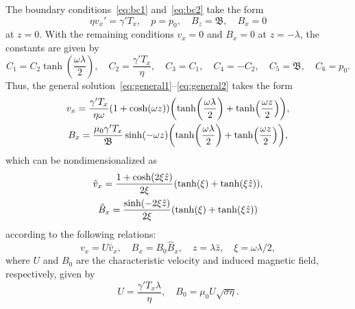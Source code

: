 \documentclass{article}
\begin{document}
The boundary conditions~\eqref{eq:bc1} and~\eqref{eq:bc2} take the form
\begin{equation}\label{eq:bc}
    \eta v_x' = \gamma'T_x, \quad p = p_0, \quad
        B_z = \mathfrak{B}, \quad B_x = 0
\end{equation}
at $z=0$.
With the remaining conditions $v_x=0$ and $B_x=0$ at $z=-\lambda$,
the constants are given by
\begin{equation}\label{eq:constants}
    C_1 = C_2\tanh(\frac{\omega\lambda}2), \quad
    C_2 = \frac{\gamma'T_x}{\eta}, \quad
    C_3 = C_1, \quad C_4 = -C_2, \quad
    C_5 = \mathfrak{B}, \quad C_6 = p_0.
\end{equation}
Thus, the general solution~\eqref{eq:general1}--\eqref{eq:general2} takes the form
\begin{gather}
    v_x = \frac{\gamma'T_x}{\eta\omega}(1+\cosh(\omega z))
        \qty(\tanh(\frac{\omega\lambda}2) + \tanh(\frac{\omega z}2)), \label{eq:v_x}\\
    B_x = \frac{\mu_0\gamma'T_x}{\mathfrak{B}}\sinh(-\omega z)
        \qty(\tanh(\frac{\omega\lambda}2) + \tanh(\frac{\omega z}2)), \label{eq:B_x}
\end{gather}
which can be nondimensionalized as
\begin{gather}
    \hat{v}_x = \frac{1+\cosh(2\xi\hat{z})}{2\xi}
        \qty( \tanh(\xi) + \tanh(\xi\hat{z}) ), \label{eq:hatv_x}\\
    \hat{B}_x = \frac{\sinh(-2\xi\hat{z})}{2\xi}
        \qty( \tanh(\xi) + \tanh(\xi\hat{z}) ) \label{eq:hatB_x}
\end{gather}
according to the following relations:
\begin{equation}\label{eq:nondimensioned}
    v_x = U \hat{v}_x, \quad B_x = B_0 \hat{B}_x, \quad
    z = \lambda \hat{z}, \quad \xi = \omega\lambda/2,
\end{equation}
where $U$ and $B_0$ are the characteristic velocity and induced magnetic field,
respectively, given by
\begin{equation}\label{eq:characteristic}
    U = \frac{\gamma'T_x\lambda}{\eta}, \quad
    B_0 = \mu_0U\sqrt{\sigma\eta}.
\end{equation}
\end{document}
